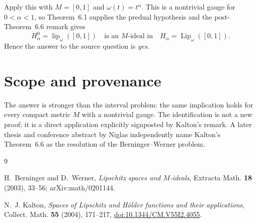 \documentclass[10pt]{article}
\begin{document}
Apply this with \(M=[0,1]\) and \(\omega(t)=t^\alpha\).  This is a
nontrivial gauge for \(0<\alpha<1\), so Theorem~6.1 supplies the predual
hypothesis and the post-Theorem~6.6 remark gives
\[
 H_\alpha^0
 =\operatorname{lip}_\omega([0,1])
 \quad\text{is an }M\text{-ideal in}\quad
 H_\alpha=\operatorname{Lip}_\omega([0,1]).
\]
Hence the answer to the source question is \emph{yes}.

\section*{Scope and provenance}

The answer is stronger than the interval problem: the same implication holds
for every compact metric \(M\) with a nontrivial gauge.  The identification is
not a new proof; it is a direct application explicitly signposted by Kalton's
remark.  A later thesis and conference abstract by Niglas independently name
Kalton's Theorem~6.6 as the resolution of the Berninger--Werner problem.

{\small
\begin{thebibliography}{9}

H.~Berninger and D.~Werner,
\emph{Lipschitz spaces and $M$-ideals},
Extracta Math. \textbf{18} (2003), 33--56;
arXiv:math/0201144.

N.~J. Kalton,
\emph{Spaces of Lipschitz and H\"older functions and their applications},
Collect. Math. \textbf{55} (2004), 171--217,
\href{https://doi.org/10.1344/CM.V55I2.4055}{doi:10.1344/CM.V55I2.4055}.

\end{thebibliography}
}
\end{document}
